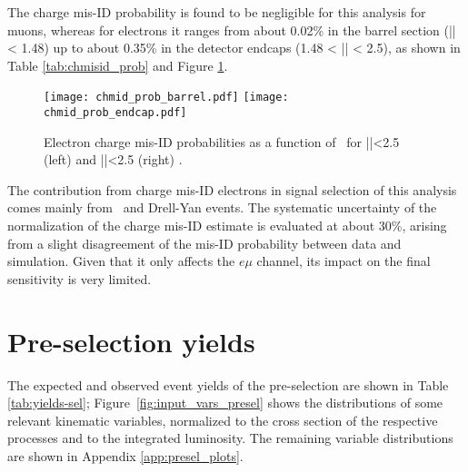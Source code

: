 The charge mis-ID probability is found to be negligible for this analysis for muons, whereas for
electrons it ranges from about 0.02\% in the barrel section (|\etac| < 1.48) up to about 0.35\% in the detector endcaps (1.48 < |\etac| < 2.5), as shown in Table \ref{tab:chmisid_prob} and Figure \ref{fig:chmisid_prob}.

\begin{figure}[htp]
\centering
\texttt{[image: chmid\_prob\_barrel.pdf]}
\texttt{[image: chmid\_prob\_endcap.pdf]}
\caption[Elecron mis-ID probabilities.]{Electron charge mis-ID probabilities as a function of \pt\ for |\etac|<2.5 (left) and |\etac|<2.5 (right) \cite{CMS_AN_2017-029}.}
\label{fig:chmisid_prob}
\end{figure}                            

The contribution from charge mis-ID electrons in signal selection of this analysis comes mainly from \ttbar\ and Drell-Yan events. The systematic uncertainty of the normalization of the charge mis-ID estimate is evaluated at about 30\%, arising from a slight disagreement of the mis-ID probability between data and simulation. Given that it only affects the $e\mu$ channel, its impact on the final sensitivity is very limited.

\section{Pre-selection yields}

The expected and observed event yields of the pre-selection are shown in Table \ref{tab:yields-sel}; Figure~\ref{fig:input_vars_presel} shows the distributions of some relevant kinematic variables, normalized to the cross section of the respective processes and to the integrated luminosity. The remaining variable distributions are shown in Appendix \ref{app:presel_plots}. 

